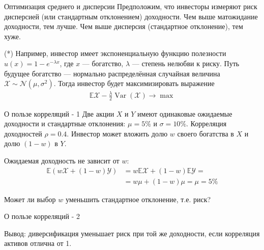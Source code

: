 \documentclass{beamer}
\begin{document}
\begin{frame}{Оптимизация среднего и дисперсии}
\justify
Предположим, что инвесторы измеряют риск дисперсией (или стандартным 
отклонением) доходности. Чем выше матожидание доходности, тем лучше. Чем выше 
дисперсия (стандартное отклонение), тем хуже.

\justify
(*) Например, инвестор имеет экспоненциальную функцию полезности
$u(x) = 1 -e^{-\lambda x}$, где $x$ --- богатство, $\lambda$ --- степень 
нелюбви к риску. Путь будущее богатство --- нормально распределённая случайная 
величина $\mathcal{X} \sim \mathcal{N}(\mu, \sigma^2)$. Тогда инвестор будет 
максимизировать выражение
\begin{align*}
\mathbb{E}\mathcal{X} - \frac{\lambda}{2}\operatorname{Var}(\mathcal{X})
\to \max
\end{align*}
\end{frame}



\begin{frame}{О пользе корреляций - 1}
\justify
Две акции $X$ и $Y$ имеют одинаковые ожидаемые доходности и стандартные отклонения: $\mu = 5\%$ и $\sigma = 10\%$. Корреляция доходностей $\rho=0.4$. Инвестор может вложить долю $w$ своего богатства в $X$ и долю $(1 - w)$ в $Y$.

\justify
Ожидаемая доходность не зависит от $w$:
\begin{align*}
\mathbb{E}(w\mathcal{X} + (1 - w)\mathcal{Y}) 
&= w\mathbb{E}\mathcal{X} + (1-w)\mathbb{E}\mathcal{Y} = \\
&= w\mu + (1 - w)\mu = \mu = 5\%
\end{align*}

\justify
Может ли выбор $w$ уменьшить стандартное отклонение, т.е. риск?
\end{frame}



\begin{frame}{О пользе корреляций - 2}
\center
{}

\justify
Вывод: диверсификация уменьшает риск при той же доходности, если корреляция активов отлична от 1.
\end{frame}
\end{document}
